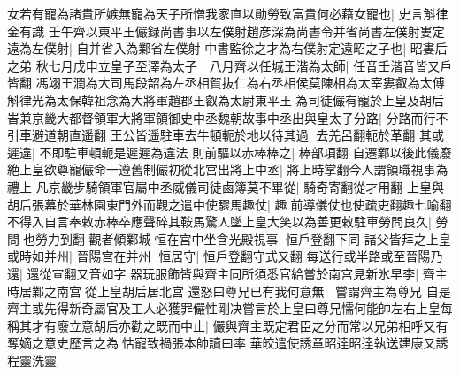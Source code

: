 女若有寵為諸貴所嫉無寵為天子所憎我家直以勛勞致富貴何必藉女寵也|{
	史言斛律金有識}
壬午齊以東平王儼録尚書事以左僕射趙彦深為尚書令并省尚書左僕射婁定遠為左僕射|{
	自并省入為鄴省左僕射}
中書監徐之才為右僕射定遠昭之子也|{
	昭婁后之弟}
秋七月戊申立皇子至澤為太子　八月齊以任城王湝為太師|{
	任音壬湝音皆又戶皆翻}
馮翊王潤為大司馬段韶為左丞相賀抜仁為右丞相侯莫陳相為太宰婁叡為太傅斛律光為太保韓祖念為大將軍趙郡王叡為太尉東平王為司徒儼有寵於上皇及胡后峕兼京畿大都督領軍大將軍領御史中丞魏朝故事中丞出與皇太子分路|{
	分路而行不引車避道朝直遥翻}
王公皆遥駐車去牛頓軛於地以待其過|{
	去羌呂翻軛於革翻}
其或遲違|{
	不即駐車頓軛是遲遲為違法}
則前驅以赤棒棒之|{
	棒部項翻}
自遷鄴以後此儀廢絶上皇欲尊寵儼命一遵舊制儼初從北宫出將上中丞|{
	將上時掌翻今人謂領職視事為禮上}
凡京畿步騎領軍官屬中丞威儀司徒鹵簿莫不畢從|{
	騎奇寄翻從才用翻}
上皇與胡后張幕於華林園東門外而觀之遣中使驟馬趣仗|{
	趣前導儀仗也使疏吏翻趣七喻翻}
不得入自言奉敕赤棒卒應聲碎其鞍馬驚人墜上皇大笑以為善更敕駐車勞問良久|{
	勞問也勞力到翻}
觀者傾鄴城恒在宫中坐含光殿視事|{
	恒戶登翻下同}
諸父皆拜之上皇或時如并州|{
	晉陽宫在并州}
恒居守|{
	恒戶登翻守式又翻}
每送行或半路或至晉陽乃還|{
	還從宣翻又音如字}
器玩服飾皆與齊主同所須悉官給嘗於南宫見新氷早李|{
	齊主時居鄴之南宫從上皇胡后居北宫}
還怒曰尊兄已有我何意無|{
	嘗謂齊主為尊兄}
自是齊主或先得新奇屬官及工人必獲罪儼性剛决嘗言於上皇曰尊兄懦何能帥左右上皇每稱其才有廢立意胡后亦勸之既而中止|{
	儼與齊主既定君臣之分而常以兄弟相呼又有奪嫡之意史歷言之為怙寵致禍張本帥讀曰率}
華皎遣使誘章昭逹昭逹執送建康又誘程靈洗靈


